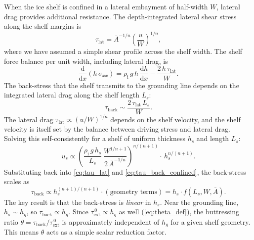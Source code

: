 \documentclass[11pt]{article}
\newcommand{\dd}{\mathrm{d}}
\newcommand{\hg}{h_g}
\newcommand{\rhoi}{\rho_{\mathrm{i}}}
\begin{document}
When the ice shelf is confined in a lateral embayment of half-width $W$, lateral drag provides additional resistance.  The depth-integrated lateral shear stress along the shelf margins is
\begin{equation}
	\tau_{\mathrm{lat}} = \bar{A}^{-1/n}\left(\frac{u}{W}\right)^{1/n},
	\label{eq:tau_lat}
\end{equation}
where we have assumed a simple shear profile across the shelf width.  The shelf force balance per unit width, including lateral drag, is \citep{Pegler2018}
\begin{equation}
	\frac{\dd}{\dd x}\!\left(h\,\sigma_{xx}\right) = \rhoi\,g\,h\,\frac{\dd h}{\dd x} - \frac{2\,h\,\tau_{\mathrm{lat}}}{W}.
	\label{eq:shelf_force_balance}
\end{equation}
The back-stress that the shelf transmits to the grounding line depends on the integrated lateral drag along the shelf length $L_s$:
\begin{equation}
	\tau_{\mathrm{back}} \sim \frac{2\,\tau_{\mathrm{lat}}\,L_s}{W}.
	\label{eq:tau_back_confined}
\end{equation}
The lateral drag $\tau_{\mathrm{lat}} \propto (u/W)^{1/n}$ depends on the shelf velocity, and the shelf velocity is itself set by the balance between driving stress and lateral drag.  Solving this self-consistently for a shelf of uniform thickness $h_s$ and length $L_s$:
\begin{equation}
	u_s \propto \left(\frac{\rhoi\,g\,h_s}{L_s}\,\frac{W^{1/n+1}}{2\,\bar{A}^{-1/n}}\right)^{n/(n+1)} \!\cdot\, h_s^{n/(n+1)}.
	\label{eq:shelf_velocity}
\end{equation}
Substituting back into \cref{eq:tau_lat} and \cref{eq:tau_back_confined}, the back-stress scales as
\begin{equation}
	\tau_{\mathrm{back}} \propto h_s^{(n+1)/(n+1)} \cdot (\text{geometry terms}) = h_s \cdot f(L_s, W, \bar{A}).
	\label{eq:tau_back_scaling}
\end{equation}
The key result is that the back-stress is \emph{linear} in $h_s$.  Near the grounding line, $h_s \sim \hg$, so $\tau_{\mathrm{back}} \propto \hg$.  Since $\tau_{\mathrm{ext}}^{\,0} \propto \hg$ as well (\cref{eq:theta_def}), the buttressing ratio $\theta = \tau_{\mathrm{back}}/\tau_{\mathrm{ext}}^{\,0}$ is approximately independent of $\hg$ for a given shelf geometry.  This means $\theta$ acts as a simple scalar reduction factor.
\end{document}
